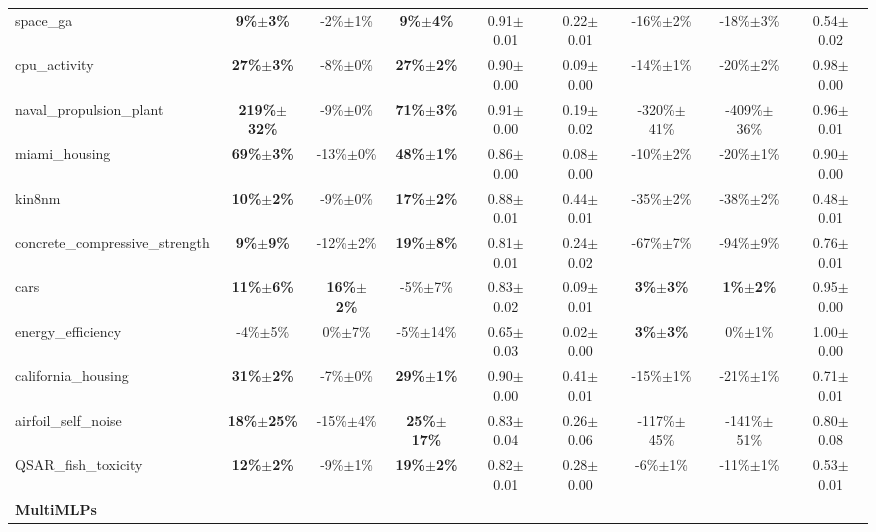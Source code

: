 \begin{table}[h]
\begin{small}
\begin{sc}
{\begin{tabular}{lcccccccc}
space\_ga  &  \textbf{9\%$\pm$3\%}  &  -2\%$\pm$1\%  &  \textbf{9\%$\pm$4\%}  &  0.91$\pm$0.01  &  0.22$\pm$0.01  &  -16\%$\pm$2\%  &  -18\%$\pm$3\%  &  0.54$\pm$0.02 \\
cpu\_activity  &  \textbf{27\%$\pm$3\%}  &  -8\%$\pm$0\%  &  \textbf{27\%$\pm$2\%}  &  0.90$\pm$0.00  &  0.09$\pm$0.00  &  -14\%$\pm$1\%  &  -20\%$\pm$2\%  &  0.98$\pm$0.00 \\
naval\_propulsion\_plant  &  \textbf{219\%$\pm$32\%}  &  -9\%$\pm$0\%  &  \textbf{71\%$\pm$3\%}  &  0.91$\pm$0.00  &  0.19$\pm$0.02  &  -320\%$\pm$41\%  &  -409\%$\pm$36\%  &  0.96$\pm$0.01 \\
miami\_housing  &  \textbf{69\%$\pm$3\%}  &  -13\%$\pm$0\%  &  \textbf{48\%$\pm$1\%}  &  0.86$\pm$0.00  &  0.08$\pm$0.00  &  -10\%$\pm$2\%  &  -20\%$\pm$1\%  &  0.90$\pm$0.00 \\
kin8nm  &  \textbf{10\%$\pm$2\%}  &  -9\%$\pm$0\%  &  \textbf{17\%$\pm$2\%}  &  0.88$\pm$0.01  &  0.44$\pm$0.01  &  -35\%$\pm$2\%  &  -38\%$\pm$2\%  &  0.48$\pm$0.01 \\
concrete\_compressive\_strength  &  \textbf{9\%$\pm$9\%}  &  -12\%$\pm$2\%  &  \textbf{19\%$\pm$8\%}  &  0.81$\pm$0.01  &  0.24$\pm$0.02  &  -67\%$\pm$7\%  &  -94\%$\pm$9\%  &  0.76$\pm$0.01 \\
cars  &  \textbf{11\%$\pm$6\%}  &  \textbf{16\%$\pm$2\%}  &  -5\%$\pm$7\%  &  0.83$\pm$0.02  &  0.09$\pm$0.01  &  \textbf{3\%$\pm$3\%}  &  \textbf{1\%$\pm$2\%}  &  0.95$\pm$0.00 \\
energy\_efficiency  &  -4\%$\pm$5\%  &  0\%$\pm$7\%  &  -5\%$\pm$14\%  &  0.65$\pm$0.03  &  0.02$\pm$0.00  &  \textbf{3\%$\pm$3\%}  &  0\%$\pm$1\%  &  1.00$\pm$0.00 \\
california\_housing  &  \textbf{31\%$\pm$2\%}  &  -7\%$\pm$0\%  &  \textbf{29\%$\pm$1\%}  &  0.90$\pm$0.00  &  0.41$\pm$0.01  &  -15\%$\pm$1\%  &  -21\%$\pm$1\%  &  0.71$\pm$0.01 \\
airfoil\_self\_noise  &  \textbf{18\%$\pm$25\%}  &  -15\%$\pm$4\%  &  \textbf{25\%$\pm$17\%}  &  0.83$\pm$0.04  &  0.26$\pm$0.06  &  -117\%$\pm$45\%  &  -141\%$\pm$51\%  &  0.80$\pm$0.08 \\
QSAR\_fish\_toxicity  &  \textbf{12\%$\pm$2\%}  &  -9\%$\pm$1\%  &  \textbf{19\%$\pm$2\%}  &  0.82$\pm$0.01  &  0.28$\pm$0.00  &  -6\%$\pm$1\%  &  -11\%$\pm$1\%  &  0.53$\pm$0.01 \\
\cmidrule(lr){1-9}
\textbf{MultiMLPs} & & & & & & & & \\ \cmidrule(lr){1-9}


\end{tabular}}
\end{sc}
\end{small}
\end{table}
